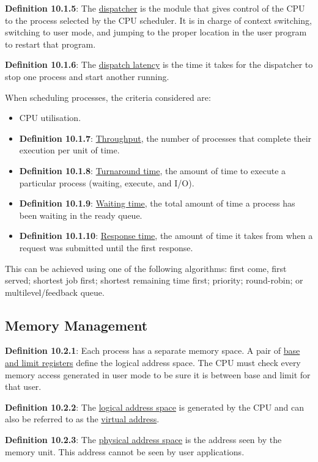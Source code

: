 \documentclass{article}
\newcommand{\separate}[1] {\vspace{#1 pt}\noindent}
\newcommand{\definition}[2]{\textbf{Definition #1}: #2\label{def:#1}}
\begin{document}
\separate{7}\definition{10.1.5}{The \underline{dispatcher} is the module that gives control of the CPU to the process selected by the CPU scheduler. It is in charge of context switching, switching to user mode, and jumping to the proper location in the user program to restart that program.}

\separate{7}\definition{10.1.6}{The \underline{dispatch latency} is the time it takes for the dispatcher to stop one process and start another running.}

\separate{7}When scheduling processes, the criteria considered are:
\begin{itemize}
    \item CPU utilisation.
    \item \definition{10.1.7}{\underline{Throughput}, the number of processes that complete their execution per unit of time.}
    \item \definition{10.1.8}{\underline{Turnaround time}, the amount of time to execute a particular process (waiting, execute, and I/O).}
    \item \definition{10.1.9}{\underline{Waiting time}, the total amount of time a process has been waiting in the ready queue.}
    \item \definition{10.1.10}{\underline{Response time}, the amount of time it takes from when a request was submitted until the first response.}
\end{itemize}
This can be achieved using one of the following algorithms: first come, first served; shortest job first; shortest remaining time first; priority; round-robin; or multilevel/feedback queue.

\subsection{Memory Management}

\definition{10.2.1}{Each process has a separate memory space. A pair of \underline{base and limit registers} define the logical address space. The CPU must check every memory access generated in user mode to be sure it is between base and limit for that user.}

\separate{7}\definition{10.2.2}{The \underline{logical address space} is generated by the CPU and can also be referred to as the \underline{virtual address}.}

\separate{7}\definition{10.2.3}{The \underline{physical address space} is the address seen by the memory unit. This address cannot be seen by user applications.}
\end{document}
